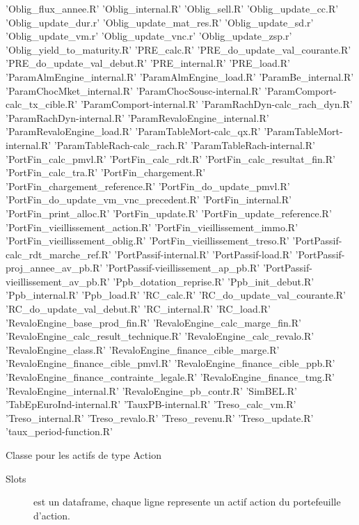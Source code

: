 \documentclass[a4paper]{book}
\begin{document}
\begin{description}
{'Oblig\_flux\_annee.R' 'Oblig\_internal.R' 'Oblig\_sell.R'
'Oblig\_update\_cc.R' 'Oblig\_update\_dur.r'
'Oblig\_update\_mat\_res.R' 'Oblig\_update\_sd.r'
'Oblig\_update\_vm.r' 'Oblig\_update\_vnc.r' 'Oblig\_update\_zsp.r'
'Oblig\_yield\_to\_maturity.R' 'PRE\_calc.R'
'PRE\_do\_update\_val\_courante.R' 'PRE\_do\_update\_val\_debut.R'
'PRE\_internal.R' 'PRE\_load.R' 'ParamAlmEngine\_internal.R'
'ParamAlmEngine\_load.R' 'ParamBe\_internal.R'
'ParamChocMket\_internal.R' 'ParamChocSousc-internal.R'
'ParamComport-calc\_tx\_cible.R' 'ParamComport-internal.R'
'ParamRachDyn-calc\_rach\_dyn.R' 'ParamRachDyn-internal.R'
'ParamRevaloEngine\_internal.R' 'ParamRevaloEngine\_load.R'
'ParamTableMort-calc\_qx.R' 'ParamTableMort-internal.R'
'ParamTableRach-calc\_rach.R' 'ParamTableRach-internal.R'
'PortFin\_calc\_pmvl.R' 'PortFin\_calc\_rdt.R'
'PortFin\_calc\_resultat\_fin.R' 'PortFin\_calc\_tra.R'
'PortFin\_chargement.R' 'PortFin\_chargement\_reference.R'
'PortFin\_do\_update\_pmvl.R'
'PortFin\_do\_update\_vm\_vnc\_precedent.R' 'PortFin\_internal.R'
'PortFin\_print\_alloc.R' 'PortFin\_update.R'
'PortFin\_update\_reference.R' 'PortFin\_vieillissement\_action.R'
'PortFin\_vieillissement\_immo.R'
'PortFin\_vieillissement\_oblig.R'
'PortFin\_vieillissement\_treso.R'
'PortPassif-calc\_rdt\_marche\_ref.R' 'PortPassif-internal.R'
'PortPassif-load.R' 'PortPassif-proj\_annee\_av\_pb.R'
'PortPassif-vieillissement\_ap\_pb.R'
'PortPassif-vieillissement\_av\_pb.R' 'Ppb\_dotation\_reprise.R'
'Ppb\_init\_debut.R' 'Ppb\_internal.R' 'Ppb\_load.R' 'RC\_calc.R'
'RC\_do\_update\_val\_courante.R' 'RC\_do\_update\_val\_debut.R'
'RC\_internal.R' 'RC\_load.R' 'RevaloEngine\_base\_prod\_fin.R'
'RevaloEngine\_calc\_marge\_fin.R'
'RevaloEngine\_calc\_result\_technique.R'
'RevaloEngine\_calc\_revalo.R' 'RevaloEngine\_class.R'
'RevaloEngine\_finance\_cible\_marge.R'
'RevaloEngine\_finance\_cible\_pmvl.R'
'RevaloEngine\_finance\_cible\_ppb.R'
'RevaloEngine\_finance\_contrainte\_legale.R'
'RevaloEngine\_finance\_tmg.R' 'RevaloEngine\_internal.R'
'RevaloEngine\_pb\_contr.R' 'SimBEL.R' 'TabEpEuroInd-internal.R'
'TauxPB-internal.R' 'Treso\_calc\_vm.R' 'Treso\_internal.R'
'Treso\_revalo.R' 'Treso\_revenu.R' 'Treso\_update.R'
'taux\_period-function.R'}
\end{description}
%
\begin{Description}\relax
Classe pour les actifs de type Action
\end{Description}
%
\begin{Section}{Slots}

\begin{description}

\item[] est un dataframe, chaque ligne represente un actif action du portefeuille d'action.

\end{description}
\end{Section}
\end{document}

